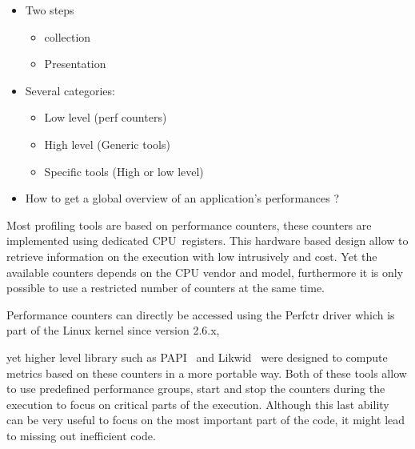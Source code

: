 \begin{itemize}
    \item Two steps
        \begin{itemize}
            \item collection
            \item Presentation
        \end{itemize}
    \item Several categories:
        \begin{itemize}
            \item Low level (perf counters)
            \item High level (Generic tools)
            \item Specific tools (High or low level)
        \end{itemize}
    \item How to get a global overview of an application's performances ?
\end{itemize}

Most profiling tools are based on performance counters, these counters are
implemented using dedicated \gls{CPU} registers. This hardware based design
allow to retrieve information on the execution with low intrusively and cost.
Yet the available counters depends on the \gls{CPU} vendor and model,
furthermore it is only possible to use a restricted number of counters at
the same time.

Performance counters can directly be accessed using the \gls{Perfctr} driver
which is part of the \gls{Linux} kernel since version 2.6.x, 

yet higher level library such as
\gls{PAPI}~\cite{Browne00Portable,Malony11Parallel,Weaver13PAPI} and
\gls{Likwid}~\cite{Treibig10LIKWID} were designed to compute metrics based on
these counters in a more portable way. Both of these tools allow to use
predefined performance groups, start and stop the counters during the
execution to focus on critical parts of the execution. Although this last
ability can be very useful to focus on the most important part of the code, it
might lead to missing out inefficient code.




